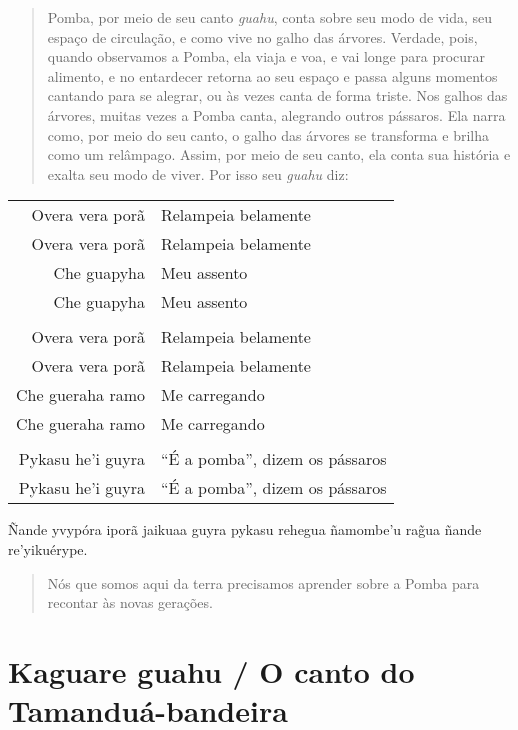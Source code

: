 \begin{itemize}
\begin{quote}
Pomba, por meio de seu canto \emph{guahu}, conta sobre seu modo de vida,
seu espaço de circulação, e como vive no galho das árvores. Verdade,
pois, quando observamos a Pomba, ela viaja e voa, e vai longe para
procurar alimento, e no entardecer retorna ao seu espaço e passa alguns
momentos cantando para se alegrar, ou às vezes canta de forma triste.
Nos galhos das árvores, muitas vezes a Pomba canta, alegrando outros
pássaros. Ela narra como, por meio do seu canto, o galho das árvores se
transforma e brilha como um relâmpago. Assim, por meio de seu canto, ela
conta sua história e exalta seu modo de viver. Por isso seu \emph{guahu}
diz:
\end{quote}


\begin{table}[]
\begin{tabular}{rl}
Overa vera porã          & Relampeia belamente           \\
Overa vera porã          & Relampeia belamente           \\
Che guapyha  		& Meu assento \\
Che guapyha          & Meu assento           \\
                  &                     \\
Overa vera porã          & Relampeia belamente           \\
Overa vera porã  		& Relampeia belamente \\
Che gueraha ramo          & Me carregando           \\
Che gueraha ramo          & Me carregando           \\                  
                  &                     \\
Pykasu he'i guyra  		& ``É a pomba'', dizem os pássaros \\
Pykasu he'i guyra          & ``É a pomba'', dizem os pássaros           \\
\end{tabular}
\end{table}




Ñande yvypóra iporã jaikuaa guyra pykasu rehegua ñamombe'u rag̃ua ñande
re'yikuérype.

\begin{quote}
Nós que somos aqui da terra precisamos aprender sobre a Pomba para
recontar às novas gerações.
\end{quote}

\chapter{Kaguare guahu / O canto do Tamanduá-bandeira}


\end{itemize}
